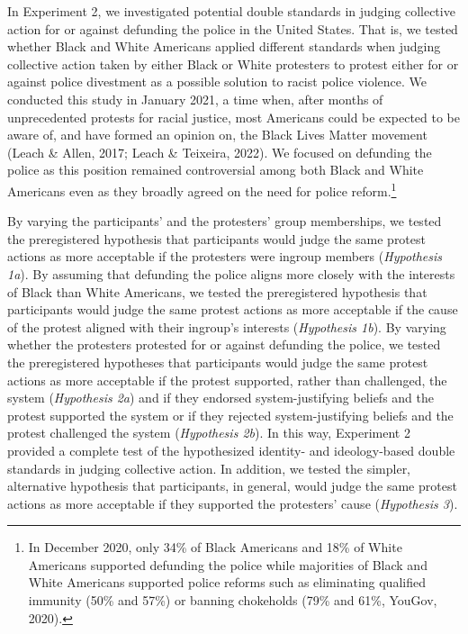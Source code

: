 \documentclass[12pt, letterpaper]{article}
\begin{document}
In Experiment 2, we investigated potential double standards in judging
collective action for or against defunding the police in the United
States. That is, we tested whether Black and White Americans applied
different standards when judging collective action taken by either Black
or White protesters to protest either for or against police divestment
as a possible solution to racist police violence. We conducted this
study in January 2021, a time when, after months of unprecedented
protests for racial justice, most Americans could be expected to be
aware of, and have formed an opinion on, the Black Lives Matter movement
(Leach \& Allen, 2017; Leach \& Teixeira, 2022). We focused on defunding
the police as this position remained controversial among both Black and
White Americans even as they broadly agreed on the need for police
reform.\footnote{In December 2020, only 34\% of Black Americans and 18\%
  of White Americans supported defunding the police while majorities of
  Black and White Americans supported police reforms such as eliminating
  qualified immunity (50\% and 57\%) or banning chokeholds (79\% and
  61\%, YouGov, 2020).}

By varying the participants' and the protesters' group memberships, we
tested the preregistered hypothesis that participants would judge the
same protest actions as more acceptable if the protesters were ingroup
members (\emph{Hypothesis 1a}). By assuming that defunding the police
aligns more closely with the interests of Black than White Americans, we
tested the preregistered hypothesis that participants would judge the
same protest actions as more acceptable if the cause of the protest
aligned with their ingroup's interests (\emph{Hypothesis 1b}). By
varying whether the protesters protested for or against defunding the
police, we tested the preregistered hypotheses that participants would
judge the same protest actions as more acceptable if the protest
supported, rather than challenged, the system (\emph{Hypothesis 2a}) and
if they endorsed system-justifying beliefs and the protest supported the
system or if they rejected system-justifying beliefs and the protest
challenged the system (\emph{Hypothesis 2b}). In this way, Experiment 2
provided a complete test of the hypothesized identity- and
ideology-based double standards in judging collective action. In
addition, we tested the simpler, alternative hypothesis that
participants, in general, would judge the same protest actions as more
acceptable if they supported the protesters' cause (\emph{Hypothesis
3}).
\end{document}
